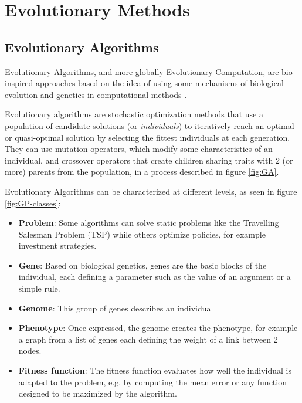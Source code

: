 \chapter{Evolutionary Methods }
\label{chap:evo}

\section{Evolutionary Algorithms}

Evolutionary Algorithms, and more globally Evolutionary Computation, are bio-inspired approaches based on the idea of using some mechanisms of biological evolution \cite{origin-of-species} and genetics \cite{genetics} in computational methods \cite{introduction-ga}. 

Evolutionary algorithms are stochastic optimization methods that use a population of candidate solutions (or \textit{individuals}) to iteratively reach an optimal or quasi-optimal solution by selecting the fittest individuals at each generation. They can use mutation operators, which modify some characteristics of an individual, and crossover operators that create children sharing traits with 2 (or more) parents from the population, in a process described in figure \ref{fig:GA}.

Evolutionary Algorithms can be characterized at different levels, as seen in figure \ref{fig:GP-classes}:
\begin{itemize}
    \item \textbf{Problem}: Some algorithms can solve static problems like the Travelling Salesman Problem (TSP) while others optimize policies, for example investment strategies.
    \item \textbf{Gene}: Based on biological genetics, genes are the basic blocks of the individual, each defining a parameter such as the value of an argument or a simple rule.
    \item \textbf{Genome}: This group of genes describes an individual 
    \item \textbf{Phenotype}: Once expressed, the genome creates the phenotype, for example a graph from a list of genes each defining the weight of a link between 2 nodes.
    \item \textbf{Fitness function}: The fitness function evaluates how well the individual is adapted to the problem, e.g. by computing the mean error or any function designed to be maximized by the algorithm.
\end{itemize}

